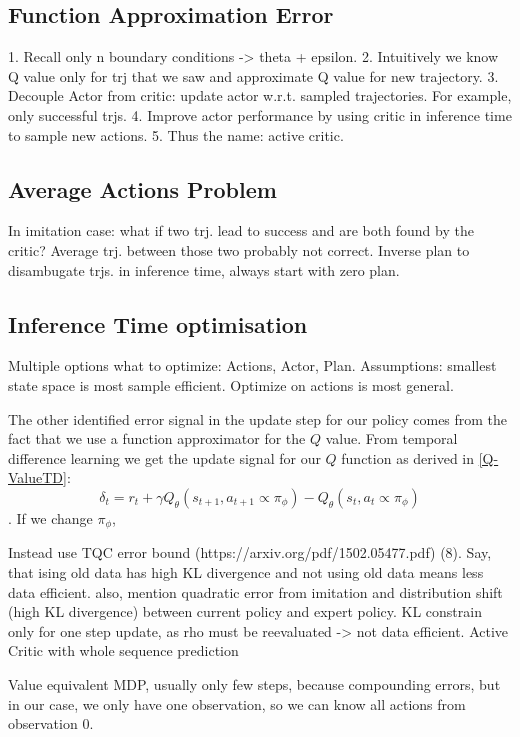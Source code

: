 \subsection{Function Approximation Error}
1. Recall only n boundary conditions -> theta + epsilon. 
2. Intuitively we know Q value only for trj that we saw and approximate Q value for new trajectory. 
3. Decouple Actor from critic: update actor w.r.t. sampled trajectories. For example, only successful trjs. 
4. Improve actor performance by using critic in inference time to sample new actions. 
5. Thus the name: active critic.

\subsection{Average Actions Problem}
In imitation case: what if two trj. lead to success and are both found by the critic? Average trj. between those two probably not correct. Inverse plan to 
disambugate trjs. in inference time, always start with zero plan.

\subsection{Inference Time optimisation}
Multiple options what to optimize: Actions, Actor, Plan. Assumptions: smallest state space is most sample efficient. Optimize on actions is most general.

The other identified error signal in the update step for our policy comes from the fact that we use a function approximator for the $Q$ value. From temporal 
difference learning we get the update signal for our $Q$ function as derived in \ref{Q-ValueTD}:
\begin{equation}
    \delta_t = r_t + \gamma Q_{\theta}(s_{t+1}, a_{t+1}\propto \pi_{\phi}) - Q_{\theta}(s_{t}, a_{t} \propto \pi_{\phi})
\end{equation}
. If we change $\pi_{\phi}$, 

Instead use TQC error bound (https://arxiv.org/pdf/1502.05477.pdf) (8). 
Say, that ising old data has high KL divergence and not using old data means less data efficient. also, mention quadratic error from imitation and 
distribution shift (high KL divergence) between current policy and expert policy.
KL constrain only for one step update, as rho must be reevaluated -> not data efficient. 
Active Critic with whole sequence prediction

Value equivalent MDP, usually only few steps, because compounding errors, but in our case, we only have one observation, so we can know all actions from observation 0. 


